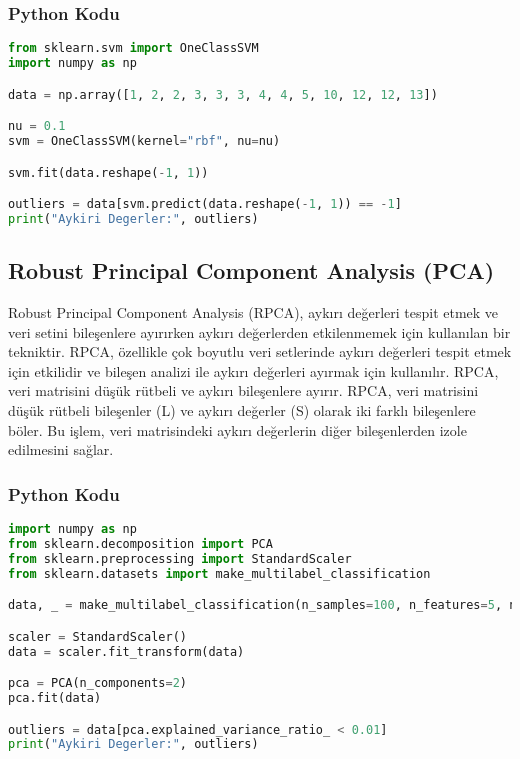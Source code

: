 \subsubsection{Python Kodu}

\begin{lstlisting}[language=Python]
from sklearn.svm import OneClassSVM
import numpy as np

data = np.array([1, 2, 2, 3, 3, 3, 4, 4, 5, 10, 12, 12, 13])

nu = 0.1
svm = OneClassSVM(kernel="rbf", nu=nu)

svm.fit(data.reshape(-1, 1))

outliers = data[svm.predict(data.reshape(-1, 1)) == -1]
print("Aykiri Degerler:", outliers)
\end{lstlisting}

\newpage

\subsection{Robust Principal Component Analysis (PCA)}
Robust Principal Component Analysis (RPCA), aykırı değerleri tespit etmek ve veri setini bileşenlere ayırırken aykırı değerlerden etkilenmemek için kullanılan bir tekniktir. RPCA, özellikle çok boyutlu veri setlerinde aykırı değerleri tespit etmek için etkilidir ve bileşen analizi ile aykırı değerleri ayırmak için kullanılır. RPCA, veri matrisini düşük rütbeli ve aykırı bileşenlere ayırır. RPCA, veri matrisini düşük rütbeli bileşenler (L) ve aykırı değerler (S) olarak iki farklı bileşenlere böler. Bu işlem, veri matrisindeki aykırı değerlerin diğer bileşenlerden izole edilmesini sağlar.

\subsubsection{Python Kodu}

\begin{lstlisting}[language=Python]
import numpy as np
from sklearn.decomposition import PCA
from sklearn.preprocessing import StandardScaler
from sklearn.datasets import make_multilabel_classification

data, _ = make_multilabel_classification(n_samples=100, n_features=5, n_classes=2, n_labels=2, n_clusters_per_class=1, random_state=42)

scaler = StandardScaler()
data = scaler.fit_transform(data)

pca = PCA(n_components=2)
pca.fit(data)

outliers = data[pca.explained_variance_ratio_ < 0.01]
print("Aykiri Degerler:", outliers)
\end{lstlisting}

\newpage